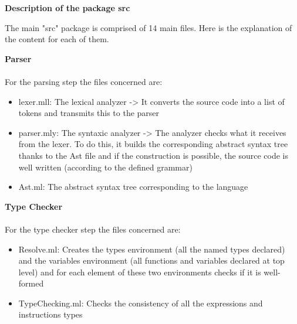 \documentclass[11pt]{report}
\begin{document}
\newpage
{}
{} 
\centerline{\textbf{\Huge Description of the package src}}
\vspace*{3pt}
\vspace*{20pt}

\tabto{1cm} The main "src" package is comprised of 14 main files. Here is the explanation of the content for each of them.

\vspace*{10pt}
{} 
\tabto{0cm} {\LARGE \textbf{Parser}}
\\ \\
For the parsing step the files concerned are:
\begin{itemize}
\item lexer.mll: The lexical analyzer -> It converts the source code into a list of tokens and transmits this to the parser
\item parser.mly: The syntaxic analyzer -> The analyzer checks what it receives from the lexer. To do this, it builds the corresponding abstract syntax tree thanks to the Ast file and if the construction is possible, the source code is well written (according to the defined grammar)
\item Ast.ml: The abstract syntax tree corresponding to the language
\end{itemize}

{} 
\tabto{0cm} {\LARGE \textbf{Type Checker}}
\\ \\
For the type checker step the files concerned are:
\begin{itemize}
\item Resolve.ml: Creates the types environment (all the named types declared) and the variables environment (all functions and variables declared at top level) and for each element of these two environments checks if it is well-formed
\item TypeChecking.ml: Checks the consistency of all the expressions and instructions types
\end{itemize}
\end{document}
